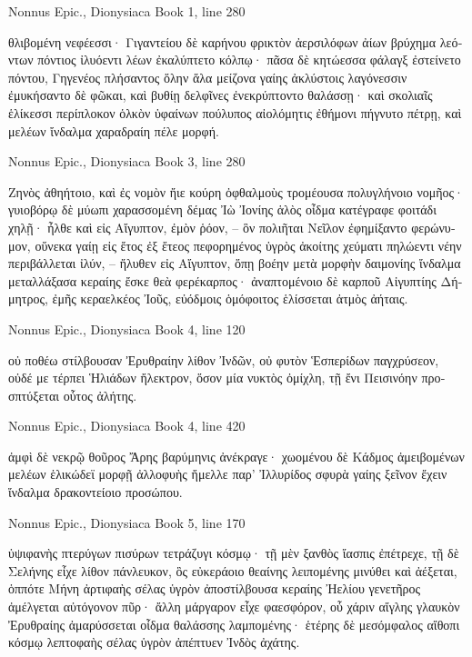 \documentclass[12pt,letterpaper,twoside,final]{memoir}
\begin{document}
\begin{greek}
Nonnus Epic., Dionysiaca 
Book 1, line 280

θλιβομένη νεφέεσσι· Γιγαντείου δὲ καρήνου 
φρικτὸν ἀερσιλόφων ἀίων βρύχημα λεόντων   
πόντιος ἰλυόεντι λέων ἐκαλύπτετο κόλπῳ· 
πᾶσα δὲ κητώεσσα φάλαγξ ἐστείνετο πόντου, 
Γηγενέος πλήσαντος ὅλην ἅλα μείζονα γαίης 
ἀκλύστοις λαγόνεσσιν ἐμυκήσαντο δὲ φῶκαι, 
καὶ βυθίῃ δελφῖνες ἐνεκρύπτοντο θαλάσσῃ· 
καὶ σκολιαῖς ἑλίκεσσι περίπλοκον ὁλκὸν ὑφαίνων 
πούλυπος αἰολόμητις ἐθήμονι πήγνυτο πέτρῃ, 
καὶ μελέων ἴνδαλμα χαραδραίη πέλε μορφή. 



Nonnus Epic., Dionysiaca 
Book 3, line 280

Ζηνὸς ἀθηήτοιο, καὶ ἐς νομὸν ἤιε κούρη 
ὀφθαλμοὺς τρομέουσα πολυγλήνοιο νομῆος· 
γυιοβόρῳ δὲ μύωπι χαρασσομένη δέμας Ἰὼ 
Ἰονίης ἁλὸς οἶδμα κατέγραφε φοιτάδι χηλῇ· 
ἦλθε καὶ εἰς Αἴγυπτον, ἐμὸν ῥόον,  – ὃν πολιῆται   
Νεῖλον ἐφημίξαντο φερώνυμον, οὕνεκα γαίῃ 
εἰς ἔτος ἐξ ἔτεος πεφορημένος ὑγρὸς ἀκοίτης 
χεύματι πηλώεντι νέην περιβάλλεται ἰλύν,  –  
ἤλυθεν εἰς Αἴγυπτον, ὅπῃ βοέην μετὰ μορφὴν 
δαιμονίης ἴνδαλμα μεταλλάξασα κεραίης 
ἔσκε θεὰ φερέκαρπος· ἀναπτομένοιο δὲ καρποῦ 
Αἰγυπτίης Δήμητρος, ἐμῆς κεραελκέος Ἰοῦς, 
εὐόδμοις ὁμόφοιτος ἑλίσσεται ἀτμὸς ἀήταις. 



Nonnus Epic., Dionysiaca 
Book 4, line 120

οὐ ποθέω στίλβουσαν Ἐρυθραίην λίθον Ἰνδῶν, 
οὐ φυτὸν Ἑσπερίδων παγχρύσεον, οὐδέ με τέρπει 
Ἡλιάδων ἤλεκτρον, ὅσον μία νυκτὸς ὀμίχλη, 
τῇ ἔνι Πεισινόην προσπτύξεται οὗτος ἀλήτης. 



Nonnus Epic., Dionysiaca 
Book 4, line 420

                                         ἀμφὶ δὲ νεκρῷ 
θοῦρος Ἄρης βαρύμηνις ἀνέκραγε· χωομένου δὲ 
Κάδμος ἀμειβομένων μελέων ἑλικώδεϊ μορφῇ 
ἀλλοφυὴς ἤμελλε παρ' Ἰλλυρίδος σφυρὰ γαίης 
ξεῖνον ἔχειν ἴνδαλμα δρακοντείοιο προσώπου. 



Nonnus Epic., Dionysiaca 
Book 5, line 170

ὑψιφανὴς πτερύγων πισύρων τετράζυγι κόσμῳ· 
τῇ μὲν ξανθὸς ἴασπις ἐπέτρεχε, τῇ δὲ Σελήνης 
εἶχε λίθον πάνλευκον, ὃς εὐκεράοιο θεαίνης 
λειπομένης μινύθει καὶ ἀέξεται, ὁππότε Μήνη 
ἀρτιφαὴς σέλας ὑγρὸν ἀποστίλβουσα κεραίης 
Ἠελίου γενετῆρος ἀμέλγεται αὐτόγονον πῦρ· 
ἄλλη μάργαρον εἶχε φαεσφόρον, οὗ χάριν αἴγλης 
γλαυκὸν Ἐρυθραίης ἀμαρύσσεται οἶδμα θαλάσσης 
λαμπομένης· ἑτέρης δὲ μεσόμφαλος αἴθοπι κόσμῳ 
λεπτοφαὴς σέλας ὑγρὸν ἀπέπτυεν Ἰνδὸς ἀχάτης. 




\end{greek}
\end{document}
